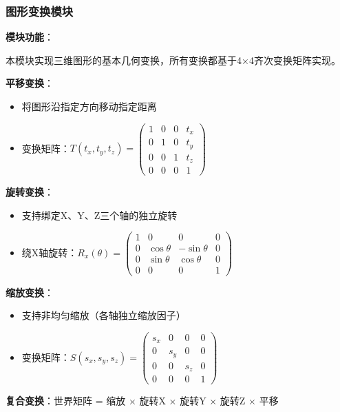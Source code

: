 \documentclass[12pt,a4paper]{article}
\begin{document}
\begin{tcolorbox}
\subsubsection{图形变换模块}

\textbf{模块功能}：

本模块实现三维图形的基本几何变换，所有变换都基于4×4齐次变换矩阵实现。

\textbf{平移变换}：
\begin{itemize}
    \item 将图形沿指定方向移动指定距离
    \item 变换矩阵：$T(t_x, t_y, t_z) = \begin{pmatrix} 1 & 0 & 0 & t_x \\ 0 & 1 & 0 & t_y \\ 0 & 0 & 1 & t_z \\ 0 & 0 & 0 & 1 \end{pmatrix}$
\end{itemize}

\textbf{旋转变换}：
\begin{itemize}
    \item 支持绑定X、Y、Z三个轴的独立旋转
    \item 绕X轴旋转：$R_x(\theta) = \begin{pmatrix} 1 & 0 & 0 & 0 \\ 0 & \cos\theta & -\sin\theta & 0 \\ 0 & \sin\theta & \cos\theta & 0 \\ 0 & 0 & 0 & 1 \end{pmatrix}$
\end{itemize}

\textbf{缩放变换}：
\begin{itemize}
    \item 支持非均匀缩放（各轴独立缩放因子）
    \item 变换矩阵：$S(s_x, s_y, s_z) = \begin{pmatrix} s_x & 0 & 0 & 0 \\ 0 & s_y & 0 & 0 \\ 0 & 0 & s_z & 0 \\ 0 & 0 & 0 & 1 \end{pmatrix}$
\end{itemize}

\textbf{复合变换}：世界矩阵 = 缩放 × 旋转X × 旋转Y × 旋转Z × 平移
\end{tcolorbox}
\end{document}

